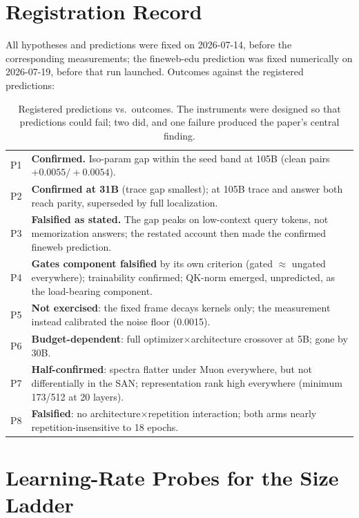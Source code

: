 \documentclass[letterpaper]{article} %
\begin{document}
\section{Registration Record}

All hypotheses and predictions were fixed on 2026-07-14, before the
corresponding measurements; the fineweb-edu prediction was fixed
numerically on 2026-07-19, before that run launched. Outcomes against the
registered predictions:

\begin{table}[h]\centering\small
\begin{tabular}{p{}p{}}
\toprule
P1 & \textbf{Confirmed.} Iso-param gap within the seed band at 105B
(clean pairs $+0.0055/+0.0054$). \\
P2 & \textbf{Confirmed at 31B} (trace gap smallest); at 105B trace and
answer both reach parity, superseded by full localization. \\
P3 & \textbf{Falsified as stated.} The gap peaks on low-context query
tokens, not memorization answers; the restated account then made the
confirmed fineweb prediction. \\
P4 & \textbf{Gates component falsified} by its own criterion (gated
$\approx$ ungated everywhere); trainability confirmed; QK-norm emerged,
unpredicted, as the load-bearing component. \\
P5 & \textbf{Not exercised}: the fixed frame decays kernels only; the
measurement instead calibrated the noise floor (0.0015). \\
P6 & \textbf{Budget-dependent}: full optimizer$\times$architecture
crossover at 5B; gone by 30B. \\
P7 & \textbf{Half-confirmed}: spectra flatter under Muon everywhere, but
not differentially in the SAN; representation rank high everywhere
(minimum 173/512 at 20 layers). \\
P8 & \textbf{Falsified}: no architecture$\times$repetition interaction;
both arms nearly repetition-insensitive to 18 epochs. \\
\bottomrule
\end{tabular}
\caption{Registered predictions vs.\ outcomes. The instruments were
designed so that predictions could fail; two did, and one failure
produced the paper's central finding.}
\end{table}

\section{Learning-Rate Probes for the Size Ladder}
\end{document}
